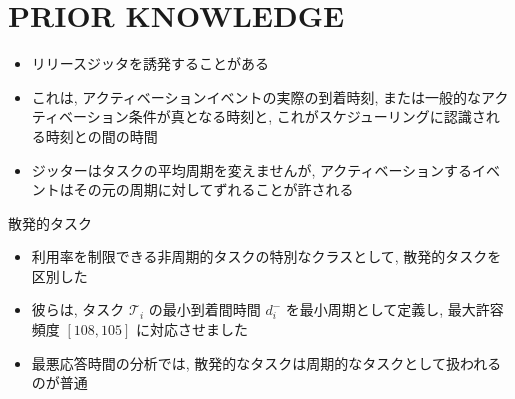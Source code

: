 
\section{PRIOR KNOWLEDGE}
\label{sec: prior knowledge}

\begin{frame}{}
    \begin{itemize}
        \item リリースジッタを誘発することがある
        \item これは, アクティベーションイベントの実際の到着時刻, または一般的なアクティベーション条件が真となる時刻と, これがスケジューリングに認識される時刻との間の時間
        \item ジッターはタスクの平均周期を変えませんが, アクティベーションするイベントはその元の周期に対してずれることが許される
    \end{itemize}
\end{frame}

\begin{frame}{散発的タスク}
    \begin{itemize}
        \item 利用率を制限できる非周期的タスクの特別なクラスとして, 散発的タスクを区別した
        \item 彼らは, タスク $\mathcal{T}_{i}$ の最小到着間時間 $d_{i}^{-}$ を最小周期として定義し, 最大許容頻度 $[108,105]$ に対応させました
        \item 最悪応答時間の分析では, 散発的なタスクは周期的なタスクとして扱われるのが普通
    \end{itemize}
\end{frame}
